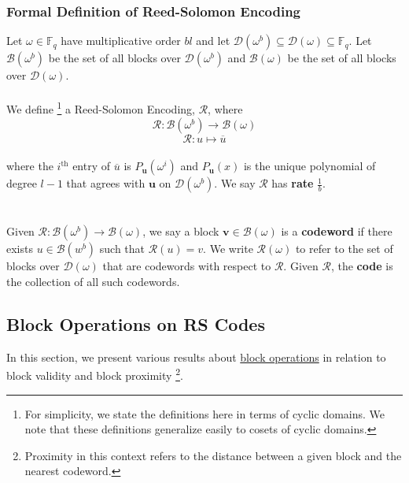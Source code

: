 \documentclass[10pt,letterpaper,titlepage]{article}
\newcommand{\GF}[1]{\mathbb{F}_{#1}}
\newcommand{\w}[0]{\omega}
\newcommand{\D}[0]{\mathcal{D}}
\theoremstyle{definition}
\begin{document}
\begin{appendices}
\subsubsection{Formal Definition of Reed-Solomon Encoding}
Let $\w\in\GF{q}$ have multiplicative order $bl$ and let $\D(\w^b)\subseteq\D(\omega)\subseteq\GF{q}$. 
Let $\mathcal{B}(\w^b)$ be the set of all blocks over $\D(\w^b)$ and $\mathcal{B}(\w)$ be the set of all blocks over $\D(\w)$.\\
\\
We define%
\footnote{For simplicity, we state the definitions here in terms of cyclic domains. 
We note that these definitions generalize easily to cosets of cyclic domains.} 
a Reed-Solomon Encoding, $\mathcal{R}$, where
\[\mathcal{R}:\mathcal{B}(\w^b)\to\mathcal{B}(\w)\]
\[\mathcal{R}:u\mapsto \overline{u}\]
\\
where the $i^\text{th}$ entry of $\overline{u}$ is $P_\mathbf{u}(\omega^i)$ and $P_\mathbf{u}(x)$ is the unique polynomial of degree $l-1$ that agrees with $\mathbf{u}$ on $\D(\w^b)$. 
We say $\mathcal{R}$ has \textbf{rate} $\frac{1}{b}$. \\
\\ \label{valid}
\\
Given $\mathcal{R}:\mathcal{B}(\w^b)\to\mathcal{B}(\w)$, we say a block $\mathbf{v}\in\mathcal{B}(\w)$ is a \textbf{codeword} if there exists $u\in\mathcal{B}(w^b)$ such that $\mathcal{R}(u)=v$. 
We write $\mathcal{R}(\w)$ to refer to the set of blocks over $\D(\w)$ that are codewords with respect to $\mathcal{R}$.
Given $\mathcal{R}$, the \textbf{code} is the collection of all such codewords.

\subsection{Block Operations on RS Codes}
In this section, we present various results about \hyperref[blocks]{block operations} in relation to block validity and block proximity%
\footnote{Proximity in this context refers to the distance between a given block and the nearest codeword.}.

\end{appendices}
\end{document}
